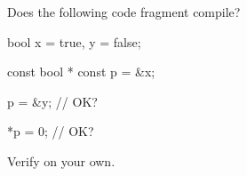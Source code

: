 Does the following code fragment compile?



\begin{consolethree}[escapeinside=||]

bool x = true, y = false;

const bool * const p = &x;



p = &y;      // OK?

*p = 0;      // OK?

\end{consolethree}

Verify on your own.

